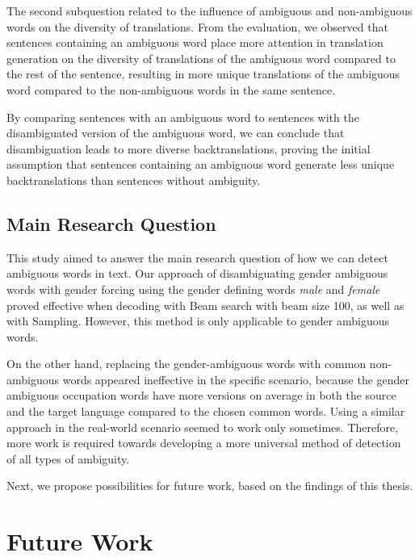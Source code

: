 The second subquestion related to the influence of ambiguous and non-ambiguous words on the diversity of translations. From the evaluation, we observed that sentences containing an ambiguous word place more attention in translation generation on the diversity of translations of the ambiguous word compared to the rest of the sentence, resulting in more unique translations of the ambiguous word compared to the non-ambiguous words in the same sentence.

By comparing sentences with an ambiguous word to sentences with the disambiguated version of the ambiguous word, we can conclude that disambiguation leads to more diverse backtranslations, proving the initial assumption that sentences containing an ambiguous word generate less unique backtranslations than sentences without ambiguity. 

\subsection{Main Research Question} %
\label{sec:Discussion:Answers:Main}

This study aimed to answer the main research question of how we can detect ambiguous words in text. Our approach of disambiguating gender ambiguous words with gender forcing using the gender defining words \textit{male} and \textit{female} proved effective when decoding with Beam search with beam size 100, as well as with Sampling. However, this method is only applicable to gender ambiguous words.

On the other hand, replacing the gender-ambiguous words with common non-ambiguous words appeared ineffective in the specific scenario, because the gender ambiguous occupation words have more versions on average in both the source and the target language compared to the chosen common words. Using a similar approach in the real-world scenario seemed to work only sometimes. Therefore, more work is required towards developing a more universal method of detection of all types of ambiguity.

Next, we propose possibilities for future work, based on the findings of this thesis.

\newpage

\section{Future Work}
\label{sec:Conclusion:Future}

